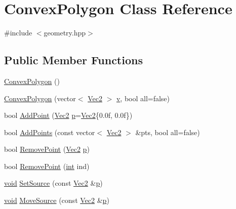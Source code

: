 \hypertarget{class_convex_polygon}{\section{Convex\-Polygon Class Reference}
\label{class_convex_polygon}
}


{\ttfamily \#include $<$geometry.\-hpp$>$}

\subsection*{Public Member Functions}
\begin{DoxyCompactItemize}
\item 
\hyperlink{class_convex_polygon_a8e1041c1037e5c3e9d218f22ec786e82}{Convex\-Polygon} ()
\item 
\hyperlink{class_convex_polygon_a513c7c6adf7492454e05ce3dadec1001}{Convex\-Polygon} (vector$<$ \hyperlink{class_vec2}{Vec2} $>$ \hyperlink{_s_d_l__opengl_8h_a10a82eabcb59d2fcd74acee063775f90}{v}, bool all=false)
\item 
bool \hyperlink{class_convex_polygon_a0c3b0cf170a6bd7adffde9006d21e1d4}{Add\-Point} (\hyperlink{class_vec2}{Vec2} \hyperlink{_s_d_l__opengl__glext_8h_aa5367c14d90f462230c2611b81b41d23}{p}=\hyperlink{class_vec2}{Vec2}\{0.\-0f, 0.\-0f\})
\item 
bool \hyperlink{class_convex_polygon_a53a7366a3e803cf09e233db349ce6470}{Add\-Points} (const vector$<$ \hyperlink{class_vec2}{Vec2} $>$ \&pts, bool all=false)
\item 
bool \hyperlink{class_convex_polygon_a22d3d39c0392a569c8d93dd1e07db473}{Remove\-Point} (\hyperlink{class_vec2}{Vec2} \hyperlink{_s_d_l__opengl__glext_8h_aa5367c14d90f462230c2611b81b41d23}{p})
\item 
bool \hyperlink{class_convex_polygon_a131eedff5285748210354dcd0ade9177}{Remove\-Point} (\hyperlink{_s_d_l__thread_8h_a6a64f9be4433e4de6e2f2f548cf3c08e}{int} ind)
\item 
\hyperlink{_s_d_l__opengles2__gl2ext_8h_ae5d8fa23ad07c48bb609509eae494c95}{void} \hyperlink{class_convex_polygon_acabcba0b752ddf52affd7b0258e46774}{Set\-Source} (const \hyperlink{class_vec2}{Vec2} \&\hyperlink{_s_d_l__opengl__glext_8h_aa5367c14d90f462230c2611b81b41d23}{p})
\item 
\hyperlink{_s_d_l__opengles2__gl2ext_8h_ae5d8fa23ad07c48bb609509eae494c95}{void} \hyperlink{class_convex_polygon_a1a8a6e044a4f8f686bb8e87017089387}{Move\-Source} (const \hyperlink{class_vec2}{Vec2} \&\hyperlink{_s_d_l__opengl__glext_8h_aa5367c14d90f462230c2611b81b41d23}{p})

\end{DoxyCompactItemize}

